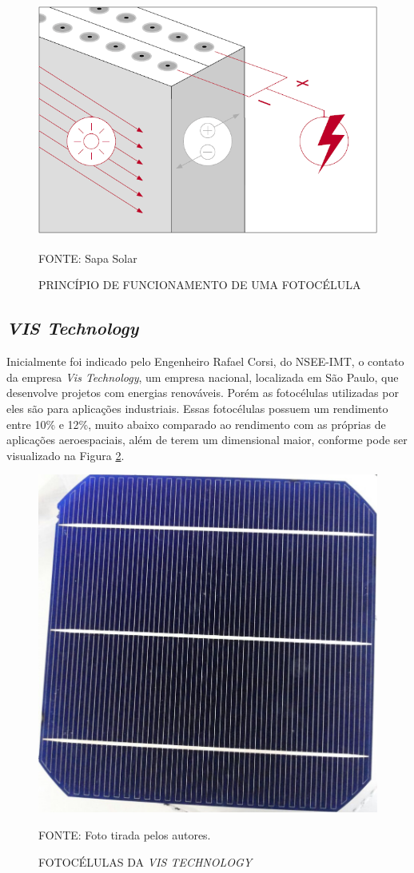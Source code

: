 \documentclass[
	12pt,				%
	openright,			%
	oneside,			%
	a4paper,			%
	english,			%
	french,				%
	spanish,			%
	brazil,				%
	oldfontcommands
	]{abntex2}
\begin{document}
	\begin{figure}[th]
		\caption{PRINCÍPIO DE FUNCIONAMENTO DE UMA FOTOCÉLULA}
		\label{Fig_PF_Cell}
		\centering
		\includegraphics[width=0.6\linewidth]{./figs/fotocelula}
			
		\begin{small}
			FONTE: Sapa Solar\textsuperscript{\cite{celula2}}
		\end{small}		
	\end{figure}
	
\subsection[VIS Technology]{\textit{VIS Technology}}
	
	Inicialmente foi indicado pelo Engenheiro Rafael Corsi, do NSEE-IMT, o contato da empresa \textit{Vis Technology}, um empresa nacional, localizada em São Paulo, que desenvolve projetos com energias renováveis. Porém as fotocélulas utilizadas por eles são para aplicações industriais. Essas fotocélulas possuem um rendimento entre 10\% e 12\%, muito abaixo comparado ao rendimento com as próprias de aplicações aeroespaciais, além de terem um dimensional maior, conforme pode ser visualizado na Figura \ref{Fig_Cell_Vis}.
	
	\begin{figure}[th]
		\caption{FOTOCÉLULAS DA \textit{VIS TECHNOLOGY}}
		\label{Fig_Cell_Vis}
		\centering
		\includegraphics[width=0.6\linewidth]{./figs/cell_vis}
			
		\begin{small}
			FONTE: Foto tirada pelos autores.
		\end{small}		
	\end{figure}
	
\end{document}
